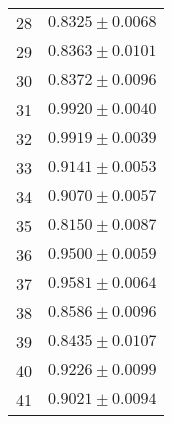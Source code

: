 \begin{center}
\begin{longtable}{|c|c|}
28 & $0.8325 \pm 0.0068 $ \\
29 & $0.8363 \pm 0.0101 $ \\
30 & $0.8372 \pm 0.0096 $ \\
31 & $0.9920 \pm 0.0040 $ \\
32 & $0.9919 \pm 0.0039 $ \\
33 & $0.9141 \pm 0.0053 $ \\
34 & $0.9070 \pm 0.0057 $ \\
35 & $0.8150 \pm 0.0087 $ \\
36 & $0.9500 \pm 0.0059 $ \\
37 & $0.9581 \pm 0.0064 $ \\
38 & $0.8586 \pm 0.0096 $ \\
39 & $0.8435 \pm 0.0107 $ \\
40 & $0.9226 \pm 0.0099 $ \\
41 & $0.9021 \pm 0.0094 $ \\
\hline
\end{longtable}
\end{center}
\clearpage
